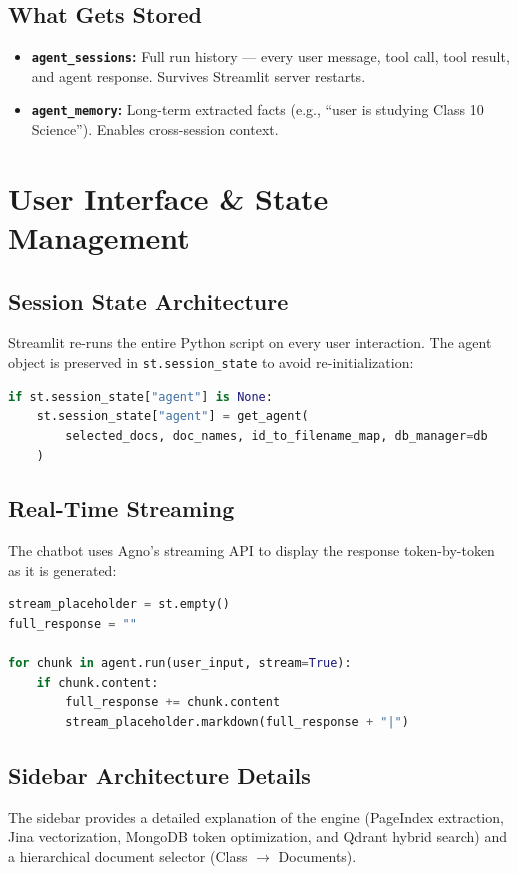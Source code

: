 \documentclass[12pt, a4paper]{article}
\begin{document}
\subsection{What Gets Stored}
\begin{itemize}
    \item \textbf{\texttt{agent\_sessions}:} Full run history — every user message, tool call, tool result, and agent response. Survives Streamlit server restarts.
    \item \textbf{\texttt{agent\_memory}:} Long-term extracted facts (e.g., ``user is studying Class 10 Science''). Enables cross-session context.
\end{itemize}

\newpage
\section{User Interface \& State Management}

\subsection{Session State Architecture}
Streamlit re-runs the entire Python script on every user interaction. The agent object is preserved in \texttt{st.session\_state} to avoid re-initialization:
\begin{lstlisting}[language=Python, caption=Session State Persistence]
if st.session_state["agent"] is None:
    st.session_state["agent"] = get_agent(
        selected_docs, doc_names, id_to_filename_map, db_manager=db
    )
\end{lstlisting}

\subsection{Real-Time Streaming}
The chatbot uses Agno's streaming API to display the response token-by-token as it is generated:
\begin{lstlisting}[language=Python, caption=Real-Time Streaming]
stream_placeholder = st.empty()
full_response = ""

for chunk in agent.run(user_input, stream=True):
    if chunk.content:
        full_response += chunk.content
        stream_placeholder.markdown(full_response + "|")
\end{lstlisting}

\subsection{Sidebar Architecture Details}
The sidebar provides a detailed explanation of the engine (PageIndex extraction, Jina vectorization, MongoDB token optimization, and Qdrant hybrid search) and a hierarchical document selector (Class $\rightarrow$ Documents).
\end{document}
